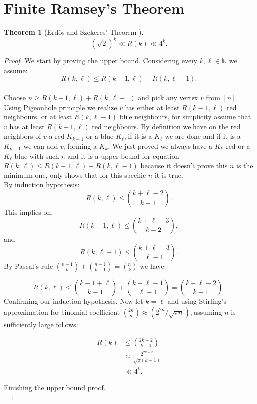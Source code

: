 \documentclass[12pt,twoside,a4paper]{book}
\numberwithin{equation}{section}
\newtheorem{theorem}             {Theorem}[section]
\theoremstyle{remark}
\begin{document}
\section{Finite Ramsey's Theorem}

\begin{theorem}[{Erd\H{o}s and Szekeres' Theorem \cite{ersz35, Er47}}]\label{thm:ErdosandS}
$$(\sqrt{2})^k \ll R(k) \ll 4^k.$$
\end{theorem}
\begin{proof} We start by proving the upper bound. Considering every $k, \ell \in \mathbb{N}$ we assume:\\
$$R(k,\ell ) \leq R(k-1,\ell )+R(k,\ell-1).$$\\
Choose $n \geq R(k-1,\ell) + R(k, \ell-1)$ and pick any vertex $v$ from $[n]$. Using Pigeonhole principle we realize $v$ has either at least $R(k-1,\ell)$ red neighbours, or at least $R(k,\ell-1)$ blue neighbours, for simplicity assume that $v$ has at least $R(k-1,\ell)$ red neighbours. By definition we have on the red neighbors of $v$ a red $K_{k-1}$ or a blue $K_{\ell}$, if it is a $K_{\ell}$ we are done and if it is a $K_{k-1}$ we can add $v$, forming a $K_k$. We just proved we always have a $K_k$ red or a $K_{\ell}$ blue with such $n$ and it is a upper bound for equation $R(k,\ell) \leq R(k-1,\ell)+R(k,\ell-1)$ because it doesn't prove this $n$ is the minimum one, only shows that for this specific $n$ it is true.\\
By induction hypothesis:
$$R(k,\ell) \leq \binom{k+\ell - 2}{k - 1}.$$
This implies on:
$$R(k-1,\ell)\leq \binom{k+\ell -3}{k-2},$$ and $$R(k,\ell-1)\leq \binom{k+\ell-3}{\ell-1}.$$
By Pascal's rule $\binom{n-1}{k} + \binom{n-1}{k-1} = \binom{n}{k}$ we have:

$$R(k,\ell)\leq \binom{k-1+\ell}{k-1} + \binom{k+\ell-1}{\ell-1} = \binom{k+ \ell -2}{k-1}.$$
Confirming our induction hypothesis. Now let $k = \ell$ and using Stirling's approximation for binomial coefficient $\binom{2n}{n} \approx (2^{2n}/\sqrt{\pi n})$, assuming $n$ is sufficiently large follows:

\begin{align*}
R(k) &\leq \binom{2k -2}{k-1}\\
& \approx \frac{2^{2k-2}}{\sqrt{\pi (k-1)}}\\
& \ll 4^k.
\end{align*}

Finishing the upper bound proof.\\


\end{proof}
\end{document}
